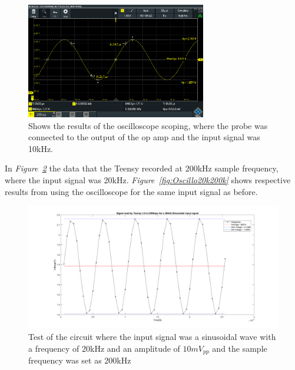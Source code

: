 \begin{figure}[h]
    \centering
    \includegraphics[width=0.7\textwidth]{graphics/10k10mvPP100ksamp.PNG}
    \caption{Shows the results of the oscilloscope scoping, where the probe was connected to the output of the op amp and the input signal was 10kHz.}
    \label{fig:Oscillo10k100k}
\end{figure}

\clearpage

In \textit{Figure~\ref{fig:Teensy20k200k}} the data that the Teensy recorded at 200kHz sample frequency, where the input signal was 20kHz.
\textit{Figure~\ref{fig:Oscillo20k200k}} shows respective results from using the oscilloscope for the same input signal as before.

\begin{figure}[h]
    \centering
    \includegraphics[width=1.0\textwidth]{graphics/20kin_200ksampl.png}
    \caption{Test of the circuit where the input signal was a sinusoidal wave with a frequency of 20kHz and an amplitude of $10mV_{pp}$ and the sample frequency was set as 200kHz}
    \label{fig:Teensy20k200k}
\end{figure}


